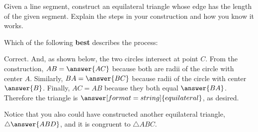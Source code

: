 \documentclass[nooutcomes]{ximera}
\begin{document}
\begin{problem}
Given a line segment, construct an equilateral triangle whose edge has the length of the given segment. Explain the steps in your construction and how you know it works.

\begin{image}
\end{image}


Which of the following \textbf{best} describes the process: 
\begin{multipleChoice} 
\end{multipleChoice}
  
\begin{problem}
Correct.  And, as shown below, the two circles intersect at point $C$.  From the construction, $AB = \answer{AC}$ because both are radii of the circle with center $A$.  Similarly, $BA = \answer{BC}$ because radii of the circle with center $\answer{B}$.  Finally, $AC=AB$ because they both equal $\answer{BA}$.  Therefore the triangle is 
$\answer[format=string]{equilateral}$, as desired.  

Notice that you also could have constructed another equilateral triangle, $\triangle \answer{ABD}$, and it is congruent to $\triangle{ABC}$.  


\end{problem}
\end{problem}
\end{document}
